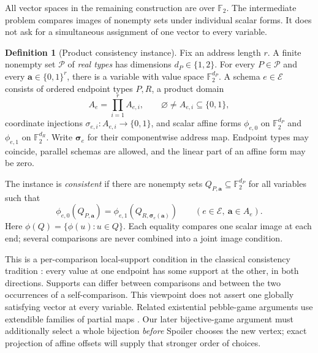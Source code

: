 \documentclass[11pt]{article}
\theoremstyle{definition}
\newtheorem{definition}[theorem]{Definition}
\begin{document}
All vector spaces in the remaining construction are over $\mathbb F_2$. The
intermediate problem compares images of nonempty sets under individual
scalar forms. It does not ask for a simultaneous assignment of one vector
to every variable.

\begin{definition}[Product consistency instance]
\label{def:scalar-images}
Fix an address length $r$. A finite nonempty set $\mathcal P$ of
\emph{real types} has dimensions $d_P\in\{1,2\}$. For every $P\in\mathcal P$
and every $\mathbf a\in\{0,1\}^r$, there is a variable with value space
$\mathbb F_2^{d_P}$. A schema $e\in\mathcal E$ consists of ordered endpoint types
$P,R$, a product domain
\[
 A_e=\prod_{i=1}^r A_{e,i},\qquad
 \varnothing\ne A_{e,i}\subseteq\{0,1\},
\]
coordinate injections $\sigma_{e,i}:A_{e,i}\to\{0,1\}$, and scalar
affine forms $\phi_{e,0}$ on $\mathbb F_2^{d_P}$ and $\phi_{e,1}$ on $\mathbb F_2^{d_R}$.
Write $\boldsymbol\sigma_e$ for their componentwise address map.
Endpoint types may coincide, parallel schemas are allowed, and the
linear part of an affine form may be zero.

The instance is \emph{consistent} if there are nonempty sets
$Q_{P,\mathbf a}\subseteq\mathbb F_2^{d_P}$ for all variables such that
\begin{equation}\label{eq:scalar-images}
 \phi_{e,0}(Q_{P,\mathbf a})
 =\phi_{e,1}(Q_{R,\boldsymbol\sigma_e(\mathbf a)})
 \qquad(e\in\mathcal E,\ \mathbf a\in A_e).
\end{equation}
Here $\phi(Q)=\{\phi(u):u\in Q\}$. Each equality compares one scalar
image at each end; several comparisons are never combined into a joint
image condition.
\end{definition}

This is a per-comparison local-support condition in the classical
consistency tradition \citep[Sections~4 and~6]{Mackworth1977}:
every value at one endpoint has some support at the other, in both
directions. Supports can differ between comparisons and between the
two occurrences of a self-comparison. This viewpoint does not assert
one globally satisfying vector at every variable.
Related existential pebble-game arguments use extendible families of
partial maps \citep[Definition~4]{Berkholz2013}. Our later bijective-game
argument must additionally select a whole bijection \emph{before}
Spoiler chooses the new vertex; exact projection of affine offsets
will supply that stronger order of choices.
\end{document}
